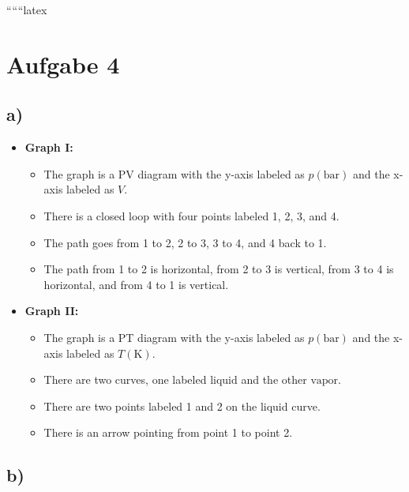 
``````latex


\section*{Aufgabe 4}

\subsection*{a)}

\begin{itemize}
    \item \textbf{Graph I:} 
    \begin{itemize}
        \item The graph is a PV diagram with the y-axis labeled as \( p(\text{bar}) \) and the x-axis labeled as \( V \).
        \item There is a closed loop with four points labeled 1, 2, 3, and 4.
        \item The path goes from 1 to 2, 2 to 3, 3 to 4, and 4 back to 1.
        \item The path from 1 to 2 is horizontal, from 2 to 3 is vertical, from 3 to 4 is horizontal, and from 4 to 1 is vertical.
    \end{itemize}
    
    \item \textbf{Graph II:} 
    \begin{itemize}
        \item The graph is a PT diagram with the y-axis labeled as \( p(\text{bar}) \) and the x-axis labeled as \( T(\text{K}) \).
        \item There are two curves, one labeled \( \text{liquid} \) and the other \( \text{vapor} \).
        \item There are two points labeled 1 and 2 on the liquid curve.
        \item There is an arrow pointing from point 1 to point 2.
    \end{itemize}
\end{itemize}

\subsection*{b)}

